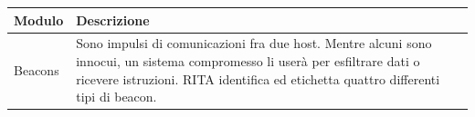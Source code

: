 \begin{center} 
\begin{longtable}{|p{}|p{}|} 
    \hline
    \textbf{Modulo} & \textbf{Descrizione} \\
    \hline
    Beacons &  
    Sono impulsi di comunicazioni fra due host. 
    Mentre alcuni sono innocui, un sistema compromesso li userà per esfiltrare dati o ricevere istruzioni. 
    RITA identifica ed etichetta quattro differenti tipi di beacon. 
    \\ 
    \hline 

\end{longtable}
\end{center}
